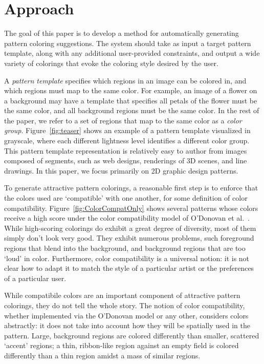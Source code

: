 \section{Approach}
\label{sec:approach}

The goal of this paper is to develop a method for automatically generating pattern coloring suggestions. The system should take as input a target pattern template, along with any additional user-provided constraints, and output a wide variety of colorings that evoke the coloring style desired by the user.

A \emph{pattern template} specifies which regions in an image can be colored in, and which regions must map to the same color. For example, an image of a flower on a background may have a template that specifies all petals of the flower must be the same color, and all background regions must be the same color. In the rest of the paper, we refer to a set of regions that map to the same color as a \emph{color group}. Figure~\ref{fig:teaser} shows an example of a pattern template visualized in grayscale, where each different lightness level identifies a different color group. This pattern template representation is relatively easy to author from images composed of segments, such as web designs, renderings of 3D scenes, and line drawings. In this paper, we focus primarily on 2D graphic design patterns. 

To generate attractive pattern colorings, a reasonable first step is to enforce that the colors used are `compatible' with one another, for some definition of color compatibility. Figure~\ref{fig:ColorCompatOnly} shows several patterns whose colors receive a high score under the color compatibility model of O'Donovan et al.~.~ While high-scoring colorings do exhibit a great degree of diversity, most of them simply don't look very good. They exhibit numerous problems, such foreground regions that blend into the background, and background regions that are too `loud' in color. Furthermore, color compatibility is a universal notion: it is not clear how to adapt it to match the style of a particular artist or the preferences of a particular user.

While compatibile colors are an important component of attractive pattern colorings, they do not tell the whole story. The notion of color compatibility, whether implemented via the O'Donovan model or any other, considers colors abstractly: it does not take into account how they will be spatially used in the pattern. Large, background regions are colored differently than smaller, scattered `accent' regions; a thin, ribbon-like region against an empty field is colored differently than a thin region amidst a mass of similar regions.

